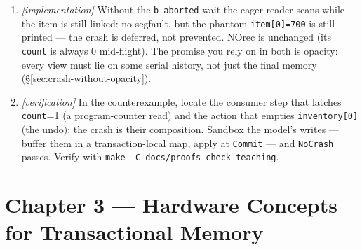 \begin{enumerate}
          Guerraoui--Kapalka give opacity a per-iteration witness history
          whose operations are ordered.  The key contrast to state: opacity
          must also handle \emph{aborted} transactions' reads, which
          linearizability is free to ignore because it only ever considers
          completed operations.
    \item \emph{[implementation]} Without the \texttt{b\_aborted} wait the
          eager reader scans while the item is still linked: no segfault, but
          the phantom \texttt{item[0]=700} is still printed --- the crash is
          deferred, not prevented. NOrec is unchanged (its \texttt{count} is
          always 0 mid-flight). The promise you rely on in both is opacity:
          every view must lie on some serial history, not just the final
          memory (\S\ref{sec:crash-without-opacity}).
    \item \emph{[verification]} In the counterexample, locate the consumer
          step that latches \texttt{count}=1 (a program-counter read) and the
          action that empties \texttt{inventory[0]} (the undo); the crash is
          their composition. Sandbox the model's writes --- buffer them in a
          transaction-local map, apply at \texttt{Commit} --- and
          \texttt{NoCrash} passes. Verify with
          \texttt{make -C docs/proofs check-teaching}.
\end{enumerate}

\section*{Chapter 3 --- Hardware Concepts for Transactional Memory}

